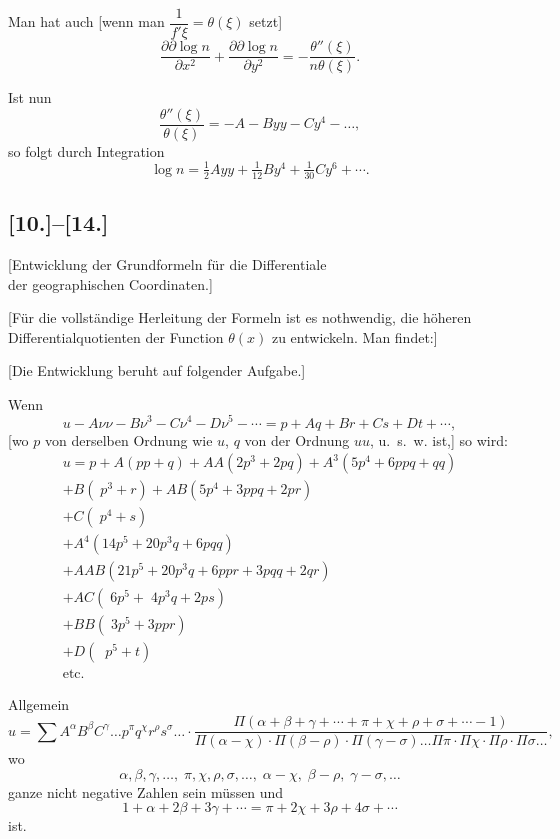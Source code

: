 \documentclass[12pt,a4paper]{article}
\begin{document}
Man hat auch [wenn man $\dfrac{1}{f'\xi} = \theta(\xi)$ setzt]
\[
\frac{\partial\partial\log n}{\partial x^2} + \frac{\partial\partial\log n}{\partial y^2} = -\frac{\theta''(\xi)}{n\theta(\xi)}.
\]

Ist nun
\[
\frac{\theta''(\xi)}{\theta(\xi)} = -A - Byy - Cy^4 - \ldots,
\]
so folgt durch Integration
\[
\log n = \tfrac{1}{2}Ayy + \tfrac{1}{12}By^4 + \tfrac{1}{30}Cy^6 + \cdots.
\]

\newpage
\subsection*{[10.]--[14.]}
\begin{center}
[Entwicklung der Grundformeln für die Differentiale\\der geographischen Coordinaten.]
\end{center}

[Für die vollständige Herleitung der Formeln ist es nothwendig, die höheren Differentialquotienten der Function $\theta(x)$ zu entwickeln. Man findet:]

[Die Entwicklung beruht auf folgender Aufgabe.]

Wenn
\[
u - A\nu\nu - B\nu^3 - C\nu^4 - D\nu^5 - \cdots = p + Aq + Br + Cs + Dt + \cdots,
\]
[wo $p$ von derselben Ordnung wie $u$, $q$ von der Ordnung $uu$, u.~s.~w. ist,] so wird:
\begin{multline*}
u = p + A(pp+q) + AA(2p^3+2pq) + A^3(5p^4+6ppq+qq)\\
+ B(\;p^3+r) + AB(5p^4+3ppq+2pr)\\
+ C(\;p^4+s)\\
+ A^4(14p^5+20p^3q+6pqq)\\
+ AAB(21p^5+20p^3q+6ppr+3pqq+2qr)\\
+ AC(\;6p^5+\;4p^3q+2ps)\\
+ BB(\;3p^5+3ppr)\\
+ D(\;\;p^5+t)\\
\text{etc.}
\end{multline*}

Allgemein
\[
u = \sum A^{\alpha}B^{\beta}C^{\gamma}\ldots p^{\pi}q^{\chi}r^{\rho}s^{\sigma}\ldots\cdot\frac{\Pi(\alpha+\beta+\gamma+\cdots+\pi+\chi+\rho+\sigma+\cdots-1)}{\Pi(\alpha-\chi)\cdot\Pi(\beta-\rho)\cdot\Pi(\gamma-\sigma)\ldots\Pi\pi\cdot\Pi\chi\cdot\Pi\rho\cdot\Pi\sigma\ldots},
\]
wo
\[
\alpha,\beta,\gamma,\ldots,\;\pi,\chi,\rho,\sigma,\ldots,\;\alpha-\chi,\;\beta-\rho,\;\gamma-\sigma,\ldots
\]
ganze nicht negative Zahlen sein müssen und
\[
1+\alpha+2\beta+3\gamma+\cdots = \pi+2\chi+3\rho+4\sigma+\cdots
\]
ist.
\end{document}
